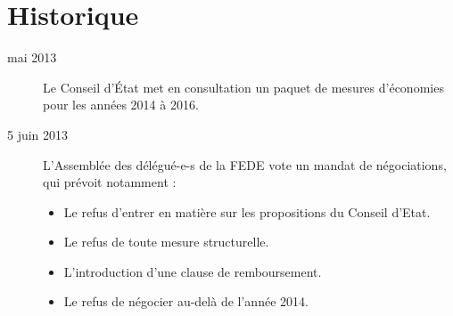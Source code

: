 
\chapter{Historique}%
\begin{description}%
	\item[mai 2013]%
		Le Conseil d'État met en consultation un paquet de mesures d'économies pour les années 2014 à 2016.

	\item[5 juin 2013]%
		L’Assemblée des délégué-e-s de la FEDE vote un mandat de
		négociations, qui prévoit notamment :
		\begin{itemize}
			\item Le refus d’entrer en matière sur les propositions du Conseil d’Etat.
			\item Le refus de toute mesure structurelle.
			\item L’introduction d’une clause de remboursement.
			\item Le refus de négocier au-delà de l’année 2014.
		\end{itemize}
\end{description}

